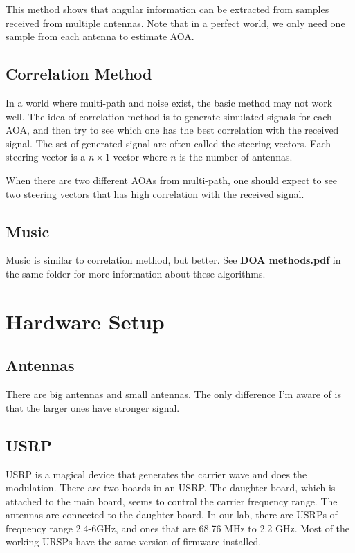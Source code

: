\documentclass[10pt]{article}
\begin{document}
This method shows that angular information can be extracted from samples received from multiple antennas.  Note that in a perfect world, we only need one sample from each antenna to estimate AOA.

\subsection{Correlation Method}
In a world where multi-path and noise exist, the basic method may not work well.  The idea of correlation method is to generate simulated signals for each AOA, and then try to see which one has the best correlation with the received signal.  The set of generated signal are often called the steering vectors.  Each steering vector is a $n\times1$ vector where $n$ is the number of antennas.

When there are two different AOAs from multi-path, one should expect to see two steering vectors that has high correlation with the received signal.

\subsection{Music}
Music is similar to correlation method, but better.  See \textbf{DOA methods.pdf} in the same folder for more information about these algorithms.




\section{Hardware Setup}
\subsection{Antennas}
There are big antennas and small antennas.  The only difference I'm aware of is that the larger ones have stronger signal.  
\subsection{USRP}
USRP is a magical device that generates the carrier wave and does the modulation.  There are two boards in an USRP.  The daughter board, which is attached to the main board, seems to control the carrier frequency range.  The antennas are connected to the daughter board.  In our lab, there are USRPs of frequency range 2.4-6GHz, and ones that are 68.76 MHz to 2.2 GHz.  Most of the working URSPs have the same version of firmware installed.  
\end{document}
